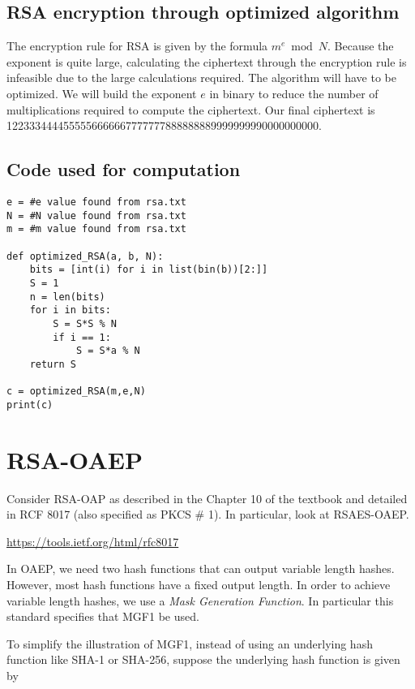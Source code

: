 \documentclass[12pt, letterpaper]{article}
\begin{document}
\begin{itemize}
\subsection{RSA encryption through optimized algorithm}
The encryption rule for RSA is given by the formula $m^{e}\bmod N$. Because the exponent is quite large, calculating the ciphertext through the encryption rule
is infeasible due to the large calculations required. The algorithm will have to be optimized. We will build the exponent $e$ in binary to reduce the number of multiplications
required to compute the ciphertext. Our final ciphertext is 1223334444555556666667777777888888889999999990000000000.
\subsection{Code used for computation}
\begin{lstlisting}
e = #e value found from rsa.txt
N = #N value found from rsa.txt
m = #m value found from rsa.txt

def optimized_RSA(a, b, N):
    bits = [int(i) for i in list(bin(b))[2:]]
    S = 1
    n = len(bits)
    for i in bits:
        S = S*S % N
        if i == 1:
            S = S*a % N
    return S

c = optimized_RSA(m,e,N)
print(c)
\end{lstlisting}

\end{itemize}

\newpage

\section{RSA-OAEP}

Consider RSA-OAP as described in the Chapter 10 of the textbook and detailed in RCF 8017 (also specified as PKCS \# 1). In particular, look at RSAES-OAEP. 

\medskip

\url{https://tools.ietf.org/html/rfc8017}

\medskip

In OAEP, we need two hash functions that can output variable length hashes. However, most hash functions have a fixed output length. In order to achieve variable length hashes, we use a \emph{Mask Generation Function}. In particular this standard specifies that MGF1 be used. 

\medskip
To simplify the illustration of MGF1, instead of using an underlying hash function like SHA-1 or SHA-256, suppose the underlying hash function is given by
\end{document}
